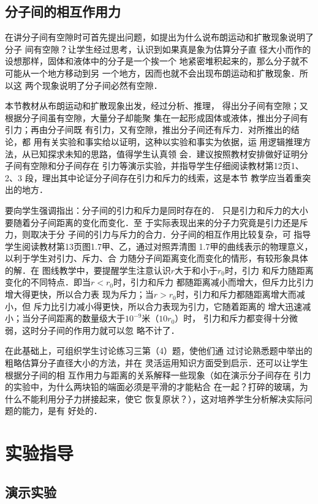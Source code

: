 \subsection{分子间的相互作用力}
在讲分子间有空隙时可首先提出问题，如提出为什么说布朗运动和扩散现象说明了分子
间有空隙？让学生经过思考，认识到如果真是象为估算分子直
径大小而作的设想那样，固体和液体中的分子是一个挨一个
地紧密堆积起来的，那么分子就不可能从一个地方移动到另
一个地方，因而也就不会出现布朗运动和扩散现象．所以这
两个现象说明了分子间必然有空隙．

本节教材从布朗运动和扩散现象出发，经过分析、推理，
得出分子间有空隙；又根据分子间虽有空隙，大量分子却能聚
集在一起形成固体或液体，推出分子间有引力；再由分子间既
有引力，又有空隙，推出分子间还有斥力．对所推出的结论，都
用有关实验和事实给以证明，这种以实验和事实为依据，运
用逻辑推理方法，从已知探求未知的思路，值得学生认真领
会．建议按照教材安排做好证明分子间有空隙和分子间存在
引力等演示实验，并指导学生仔细阅读教材第12页1、2、3
段，理出其中论证分子间存在引力和斥力的线索，这是本节
教学应当着重突出的地方．

要向学生强调指出：分子间的引力和斥力是同时存在的．
只是引力和斥力的大小要随着分子间距离的变化而变化．至
于实际表现出来的分子力究竟是引力还是斥力，则取决于分
子间的引力与斥力的合力．分子间的相互作用比较复杂，可
指导学生阅读教材第13页图1.7甲、乙，通过对照弄清图
1.7甲的曲线表示的物理意义，以利于学生对引力、斥力、合
力随分子间距离变化而变化的情形，有较形象具体的解．在
图线教学中，要提醒学生注意认识$r$大于和小于$r_0$时，引力
和斥力随距离变化的不同特点．即当$r<r_0$时，引力和斥力
都随距离减小而增大，但斥力比引力增大得更快，所以合力表
现为斥力；当$r>r_0$时，引力和斥力都随距离增大而减小，但
斥力比引力减小得更快，所以合力表现为引力，它随着距离的
增大迅速减小；当分子间距离的数量级大于$10^{-9}$米（$10r_0$）时，
引力和斥力都变得十分微弱，这时分子间的作用力就可以忽
略不计了．

在此基础上，可组织学生讨论练习三第（4）题，使他们通
过讨论熟悉题中举出的粗略估算分子直径大小的方法，并在
灵活运用知识方面受到启示．还可以让学生根据分子间的相
互作用力与距离的关系解释一些现象（如在演示分子间存在
引力的实验中，为什么两块铅的端面必须是平滑的才能粘合
在一起？打碎的玻璃，为什么不能利用分子力拼接起来，使它
恢复原状？），这对培养学生分析解决实际问题的能力，是有
好处的．

\section{实验指导}
\subsection{演示实验}
